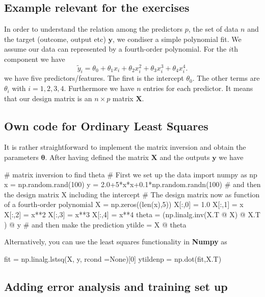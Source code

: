 \documentclass[%
oneside,                 %
final,                   %
10pt]{article}
\begin{document}
\subsection{Example relevant for the exercises}

In order to understand the relation among the predictors $p$, the set of data $n$ and the target (outcome, output etc) $\bm{y}$,
we condiser a simple polynomial fit.
We assume our data can represented by a fourth-order polynomial. For the $i$th component we have 
\[
\tilde{y}_i = \theta_0+\theta_1x_i+\theta_2x_i^2+\theta_3x_i^3+\theta_4x_i^4.
\]
we have five predictors/features. The first is the intercept $\theta_0$. The other terms are $\theta_i$ with $i=1,2,3,4$. Furthermore we have $n$ entries for each predictor. It means that our design matrix is an 
$n\times p$ matrix $\bm{X}$.

\subsection{Own code for Ordinary Least Squares}

It is rather straightforward to implement the matrix inversion and obtain the parameters $\bm{\theta}$. After having defined the matrix $\bm{X}$ and the outputs $\bm{y}$ we have 

















\bpycod
# matrix inversion to find theta
# First we set up the data
import numpy as np
x = np.random.rand(100)
y = 2.0+5*x*x+0.1*np.random.randn(100)
# and then the design matrix X including the intercept
#  The design matrix now as function of a fourth-order polynomial
X = np.zeros((len(x),5))
X[:,0] = 1.0
X[:,1] = x
X[:,2] = x**2
X[:,3] = x**3
X[:,4] = x**4
theta = (np.linalg.inv(X.T @ X) @ X.T ) @ y
# and then make the prediction
ytilde = X @ theta

\epycod

Alternatively, you can use the least squares functionality in \textbf{Numpy} as



\bpycod
fit = np.linalg.lstsq(X, y, rcond =None)[0]
ytildenp = np.dot(fit,X.T)

\epycod


\subsection{Adding error analysis and training set up}
\end{document}
